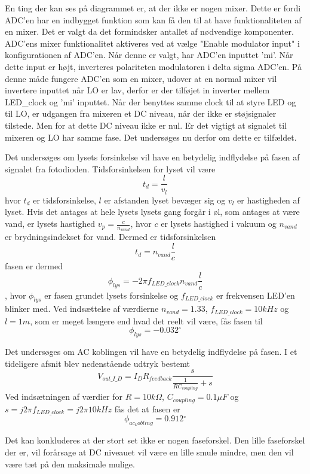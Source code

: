 \documentclass[HardwareDesign/HardwareDesign_main.tex]{subfiles}
\begin{document}
En ting der kan ses på diagrammet er, at der ikke er nogen mixer. Dette er fordi ADC'en har en indbygget funktion som kan få den til at have funktionaliteten af en mixer. Det er valgt da det formindsker antallet af nødvendige komponenter. ADC'ens mixer funktionalitet aktiveres ved at vælge "Enable modulator input" i konfigurationen af ADC'en. Når denne er valgt, har ADC'en inputtet 'mi'. Når dette input er højt, inverteres polariteten modulatoren i delta sigma ADC'en. På denne måde fungere ADC'en som en mixer, udover at en normal mixer vil invertere inputtet når LO er lav, derfor er der tilføjet in inverter mellem LED\_clock og 'mi' inputtet.
Når der benyttes samme clock til at styre LED og til LO, er udgangen fra mixeren et DC niveau, når der ikke er støjsignaler tilstede. Men for at dette DC niveau ikke er nul. Er det vigtigt at signalet til mixeren og LO har samme fase. Det undersøges nu derfor om dette er tilfældet.

Det undersøges om lysets forsinkelse vil have en betydelig indflydelse på fasen af signalet fra fotodioden. Tidsforsinkelsen for lyset vil være 
$$t_d = \frac{l}{v_l}$$
hvor $t_d$ er tidsforsinkelse, $l$ er afstanden lyset bevæger sig og $v_l$ er hastigheden af lyset. Hvis det antages at hele lysets lysets gang forgår i øl, som antages at være vand, er lysets hastighed $v_p = \frac{c}{n_{vand}}$, hvor $c$ er lysets hastighed i vakuum og $n_{vand}$ er brydningsindekset for vand.
Dermed er tidsforsinkelsen
$$t_d = n_{vand}\frac{l}{c}$$
fasen er dermed
$$\phi_{lys} = -2 \pi f_{LED\_clock} n_{vand}\frac{l}{c}$$, hvor $\phi_{lys}$ er fasen grundet lysets forsinkelse og $f_{LED\_clock}$ er frekvensen LED'en blinker med. Ved indsættelse af værdierne $n_{vand}=1.33$, $f_{LED\_clock} = 10kHz$ og $l=1m$, som er meget længere end hvad det reelt vil være, fås fasen til 
$$\phi_{lys} = -0.032 \si{^{\circ}}$$

Det undersøges om AC koblingen vil have en betydelig indflydelse på fasen. I et tideligere afsnit blev nedenstående udtryk bestemt
$$V_{out\_I\_D} = I_D R_{feedback} \frac{s}{\frac{1}{R C_{coupling}} + s}$$
Ved indsætningen af værdier for $R=10k\Omega$, $C_{coupling} = 0.1 \si{\mu F}$ og $s=j2\pi f_{LED\_clock} = j2\pi 10 \si{kHz}$ fås det at fasen er 
$$\phi_{ac_kobling} = 0.912\si{^{\circ}}$$

Det kan konkluderes at der stort set ikke er nogen faseforskel. Den lille faseforskel der er, vil forårsage at DC niveauet vil være en lille smule mindre, men den vil være tæt på den maksimale mulige. 
\end{document}
